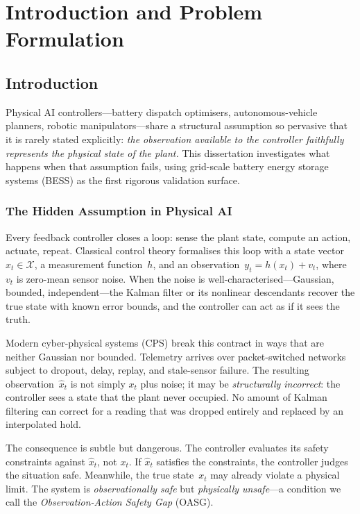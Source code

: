 \chapter{Introduction and Problem Formulation}
\label{ch:ch01_introduction}


\section{Introduction}
\label{ch:introduction}

Physical AI controllers---battery dispatch optimisers, autonomous-vehicle
planners, robotic manipulators---share a structural assumption so pervasive
that it is rarely stated explicitly: \emph{the observation available to the
controller faithfully represents the physical state of the plant.}  This
dissertation investigates what happens when that assumption fails, using
grid-scale battery energy storage systems (BESS) as the first rigorous
validation surface.

\subsection{The Hidden Assumption in Physical AI}

Every feedback controller closes a loop: sense the plant state, compute an
action, actuate, repeat.  Classical control theory formalises this loop with
a state vector~$x_t \in \mathcal{X}$, a measurement function~$h$, and an
observation~$y_t = h(x_t) + v_t$, where $v_t$ is zero-mean sensor noise.
When the noise is well-characterised---Gaussian, bounded, independent---the
Kalman filter or its nonlinear descendants recover the true state with known
error bounds, and the controller can act as if it sees the truth.

Modern cyber-physical systems (CPS) break this contract in ways that are
neither Gaussian nor bounded.  Telemetry arrives over packet-switched
networks subject to dropout, delay, replay, and stale-sensor failure.
The resulting observation~$\hat{x}_t$ is not simply $x_t$ plus noise;
it may be \emph{structurally incorrect}: the controller sees a state that
the plant never occupied.  No amount of Kalman filtering can correct for a
reading that was dropped entirely and replaced by an interpolated hold.

The consequence is subtle but dangerous.  The controller evaluates its
safety constraints against $\hat{x}_t$, not $x_t$.  If $\hat{x}_t$
satisfies the constraints, the controller judges the situation safe.
Meanwhile, the true state~$x_t$ may already violate a physical limit.
The system is \emph{observationally safe} but \emph{physically unsafe}---a
condition we call the \emph{Observation-Action Safety Gap} (OASG).

